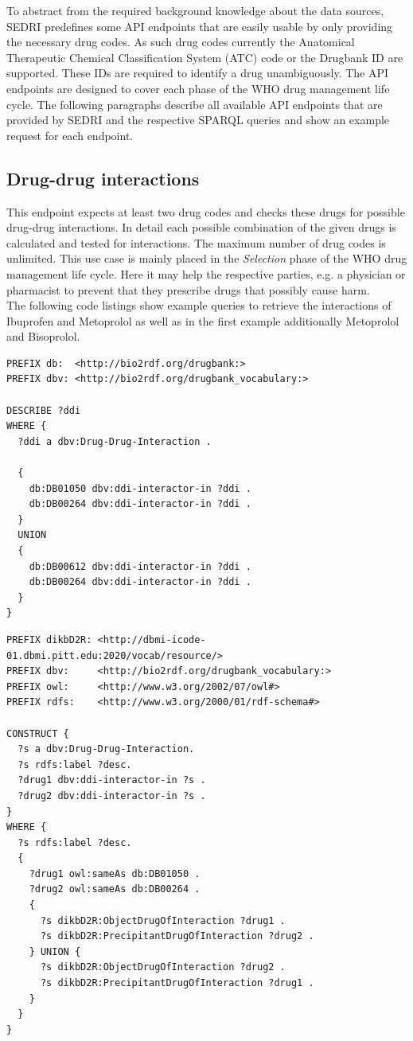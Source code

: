 To abstract from the required background knowledge about the data sources, SEDRI predefines some API endpoints that are easily usable by only providing the necessary drug codes.
As such drug codes currently the Anatomical Therapeutic Chemical Classification System (ATC) code or the Drugbank ID are supported.
These IDs are required to identify a drug unambiguously.
The API endpoints are designed to cover each phase of the WHO drug management life cycle.
The following paragraphs describe all available API endpoints that are provided by SEDRI and the respective SPARQL queries and show an example request for each endpoint.

\subsection*{Drug-drug interactions}
This endpoint expects at least two drug codes and checks these drugs for possible drug-drug interactions.
In detail each possible combination of the given drugs is calculated and tested for interactions.
The maximum number of drug codes is unlimited.
This use case is mainly placed in the \textit{Selection} phase of the WHO drug management life cycle.
Here it may help the respective parties, e.g. a physician or pharmacist to prevent that they prescribe drugs that possibly cause harm.\\
The following code listings show example queries to retrieve the interactions of Ibuprofen and Metoprolol as well as in the first example additionally Metoprolol and Bisoprolol.
\begin{lstlisting}[caption=Example Drugbank query for drug-drug interactions between Ibuprofen~--~Metoprolol and Bisoprolol -- Metoprolol]
PREFIX db:  <http://bio2rdf.org/drugbank:>
PREFIX dbv: <http://bio2rdf.org/drugbank_vocabulary:>

DESCRIBE ?ddi
WHERE {
  ?ddi a dbv:Drug-Drug-Interaction .
  
  {
    db:DB01050 dbv:ddi-interactor-in ?ddi .
    db:DB00264 dbv:ddi-interactor-in ?ddi .
  }
  UNION
  {
    db:DB00612 dbv:ddi-interactor-in ?ddi .
    db:DB00264 dbv:ddi-interactor-in ?ddi .
  }
}
\end{lstlisting}
\begin{lstlisting}[caption=Example DIKB query for drug-drug interactions between Ibuprofen and Metoprolol]
PREFIX dikbD2R: <http://dbmi-icode-01.dbmi.pitt.edu:2020/vocab/resource/>
PREFIX dbv:     <http://bio2rdf.org/drugbank_vocabulary:>
PREFIX owl:     <http://www.w3.org/2002/07/owl#>
PREFIX rdfs:    <http://www.w3.org/2000/01/rdf-schema#>

CONSTRUCT {
  ?s a dbv:Drug-Drug-Interaction.
  ?s rdfs:label ?desc.
  ?drug1 dbv:ddi-interactor-in ?s .
  ?drug2 dbv:ddi-interactor-in ?s .
}
WHERE {
  ?s rdfs:label ?desc.
  {
    ?drug1 owl:sameAs db:DB01050 .
    ?drug2 owl:sameAs db:DB00264 .
    {
      ?s dikbD2R:ObjectDrugOfInteraction ?drug1 .
      ?s dikbD2R:PrecipitantDrugOfInteraction ?drug2 .
    } UNION {
      ?s dikbD2R:ObjectDrugOfInteraction ?drug2 .
      ?s dikbD2R:PrecipitantDrugOfInteraction ?drug1 .
    }
  }
}
\end{lstlisting}
